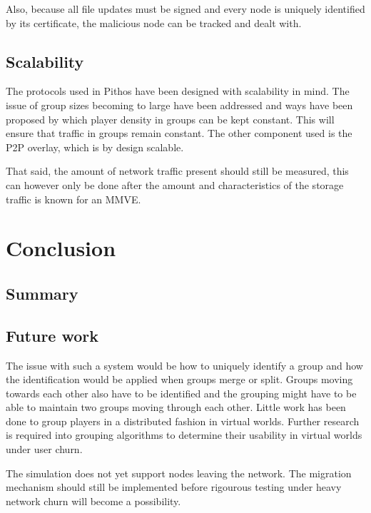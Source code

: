 \documentclass[10pt,a4paper,conference]{IEEEtran}
\begin{document}
Also, because all file updates must be signed and every node is uniquely identified by its certificate, the malicious node can be tracked and dealt
with.

\subsection{Scalability}

The protocols used in Pithos have been designed with scalability in mind. The issue of group sizes becoming to large have been addressed and ways
have been proposed by which player density in groups can be kept constant. This will ensure that traffic in groups remain constant. The other
component used is the P2P overlay, which is by design scalable.

That said, the amount of network traffic present should still be measured, this can however only be done after the amount and characteristics of the
storage traffic is known for an MMVE.

\section{Conclusion}
\label{conclusion}

\subsection{Summary}

\subsection{Future work}


The issue with such a system would be how to uniquely identify a group and how the identification would be applied when groups merge or split. Groups
moving towards each other also have to be identified and the grouping might have to be able to maintain two groups moving through each other. Little
work has been done to group players in a distributed fashion in virtual worlds. Further research is required into grouping algorithms to determine
their usability in virtual worlds under user churn.

The simulation does not yet support nodes leaving the network. The migration mechanism should still be implemented before rigourous testing under
heavy network churn will become a possibility.

\end{document}
